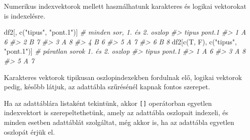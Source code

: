 \documentclass[
]{book}
\newenvironment{Shaded}{\begin{snugshade}}{\end{snugshade}}
\newcommand{\CommentTok}[1]{\textcolor[rgb]{0.56,0.35,0.01}{\textit{#1}}}
\newcommand{\FunctionTok}[1]{\textcolor[rgb]{0.00,0.00,0.00}{#1}}
\newcommand{\NormalTok}[1]{#1}
\newcommand{\StringTok}[1]{\textcolor[rgb]{0.31,0.60,0.02}{#1}}
\begin{document}
Numerikus indexvektorok mellett használhatunk karakteres és logikai vektorokat is indexelésre.

\begin{Shaded}
\begin{Highlighting}[]
\NormalTok{df2[, }\FunctionTok{c}\NormalTok{(}\StringTok{"tipus"}\NormalTok{, }\StringTok{"pont.1"}\NormalTok{)]         }\CommentTok{\# minden sor, 1. és 2. oszlop}
\CommentTok{\#\textgreater{}   tipus pont.1}
\CommentTok{\#\textgreater{} 1     A      6}
\CommentTok{\#\textgreater{} 2     B      7}
\CommentTok{\#\textgreater{} 3     A      8}
\CommentTok{\#\textgreater{} 4     B      6}
\CommentTok{\#\textgreater{} 5     A      7}
\CommentTok{\#\textgreater{} 6     B      8}
\NormalTok{df2[}\FunctionTok{c}\NormalTok{(T, F), }\FunctionTok{c}\NormalTok{(}\StringTok{"tipus"}\NormalTok{, }\StringTok{"pont.1"}\NormalTok{)]  }\CommentTok{\# páratlan sorok 1. és 2. oszlop}
\CommentTok{\#\textgreater{}   tipus pont.1}
\CommentTok{\#\textgreater{} 1     A      6}
\CommentTok{\#\textgreater{} 3     A      8}
\CommentTok{\#\textgreater{} 5     A      7}
\end{Highlighting}
\end{Shaded}

Karakteres vektorok tipikusan oszlopindexekben fordulnak elő, logikai vektorok pedig, később látjuk, az adattábla szűrésénél kapnak fontos szerepet.

Ha az adattáblára listaként tekintünk, akkor \texttt{{[}{]}} operátorban egyetlen indexvektort is szerepeltethetünk, amely az adattábla oszlopait indexeli, és minden esetben adattáblát szolgáltat, még akkor is, ha az adattábla egyetlen oszlopát érjük el.
\end{document}
